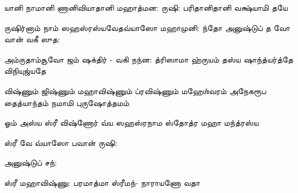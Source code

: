 \documentclass[10pt]{article}
\begin{document}
{\newpage
\SlokaLarge
{யானி நாமானி ணானி}{வியாதானி மஹாத்மன:}
{ருஷி: பரிதானி}{தானி வக்ஷ்யாமி தயே}

\SlokaLarge
{ருஷிர்‌னாம்‌ நாம் ஸஹஸ்ரஸ்ய}{வேதவ்யாஸோ மஹாமுனி:}
{ந்தோ \dash அனுஷ்டுப்‌ த வோ} {வான்‌ வகீ ஸுத:}

\SlokaLarge
{அம்ருதாம்சூவோ ஜம்} {ஷக்திர் - வகி நந்ன:}
{த்ரிஸாமா ஹ்ருயம்‌ தஸ்ய ஷாந்த்யர்த்தே விநியுஜ்யதே}

\SlokaLarge
{விஷ்ணும்‌ ஜிஷ்ணும்‌ மஹாவிஷ்ணும்‌} {ப்ரவிஷ்ணும்‌ மஹேஶ்வரம்‌}
{அநேகரூப தைத்யாந்தம்‌} {நமாமி புருஷோத்தமம்‌}

\resetcountr
\newpage
{}

\SlokaLarge
{ஓம் அஸ்ய ஸ்ரீ விஷ்ணோர்‌ வ்ய}
{ஸஹஸ்ரநாம ஸ்தோத்ர} {மஹா மந்த்ரஸ்ய}

\SlokaLarge
{ஸ்ரீ வே வ்யாஸோ பவான்‌ ருஷி:}

\SlokaLarge
{அனுஷ்டுப் சந்:}

\SlokaLarge
{ஸ்ரீ மஹாவிஷ்ணு:}
{பரமாத்மா ஸ்ரீமந்‌-}
{நாராயணோ வதா}






}
\end{document}
